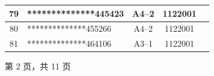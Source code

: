 \documentclass[UTF8,10pt,a4paper,fontset=fandol]{ctexart}
\newcommand{\fieldvalue}[1]{#1}
\begin{document}
\begin{center}
\begin{tabular}{|c|p{4.2cm}|c|c|p{2.0cm}|}
\fieldvalue{79} &
\fieldvalue{**************445423} &
\fieldvalue{A4--2} &
\fieldvalue{1122001} & \\ \hline
\fieldvalue{80} &
\fieldvalue{**************455266} &
\fieldvalue{A4--2} &
\fieldvalue{1122001} & \\ \hline
\fieldvalue{81} &
\fieldvalue{**************464106} &
\fieldvalue{A3--1} &
\fieldvalue{1122001} & \\ \hline
\end{tabular}
\end{center}

\begin{center}
第 2 页，共 11 页
\end{center}

\newpage
\end{document}
